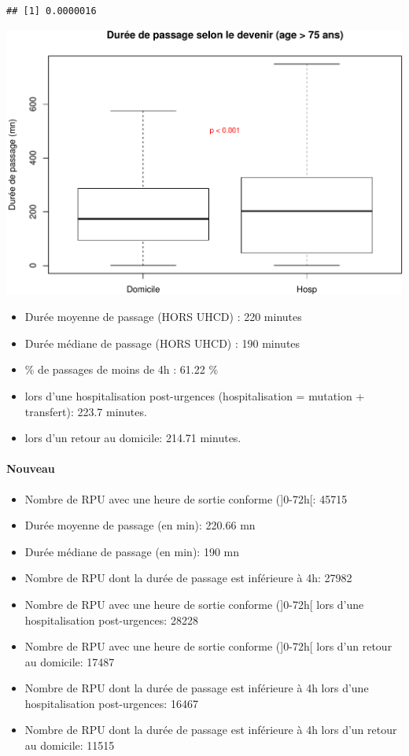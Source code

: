 \documentclass[]{article}
\begin{document}
\begin{verbatim}
## [1] 0.0000016
\end{verbatim}

\includegraphics{rapport2014_V4_files/figure-latex/duree_passage_75-1.pdf}

\begin{itemize}
\itemsep1pt\parskip0pt
\item
  Durée moyenne de passage (HORS UHCD) : 220 minutes
\item
  Durée médiane de passage (HORS UHCD) : 190 minutes
\item
  \% de passages de moins de 4h : 61.22 \%
\item
  lors d'une hospitalisation post-urgences (hospitalisation = mutation +
  transfert): 223.7 minutes.
\item
  lors d'un retour au domicile: 214.71 minutes.
\end{itemize}

\paragraph{Nouveau}\label{nouveau}

\begin{itemize}
\item
  Nombre de RPU avec une heure de sortie conforme ({]}0-72h{[}: 45715
\item
  Durée moyenne de passage (en min): 220.66 mn
\item
  Durée médiane de passage (en min): 190 mn
\item
  Nombre de RPU dont la durée de passage est inférieure à 4h: 27982
\item
  Nombre de RPU avec une heure de sortie conforme ({]}0-72h{[} lors
  d'une hospitalisation post-urgences: 28228
\item
  Nombre de RPU avec une heure de sortie conforme ({]}0-72h{[} lors d'un
  retour au domicile: 17487
\item
  Nombre de RPU dont la durée de passage est inférieure à 4h lors d'une
  hospitalisation post-urgences: 16467
\item
  Nombre de RPU dont la durée de passage est inférieure à 4h lors d'un
  retour au domicile: 11515
\end{itemize}
\end{document}
